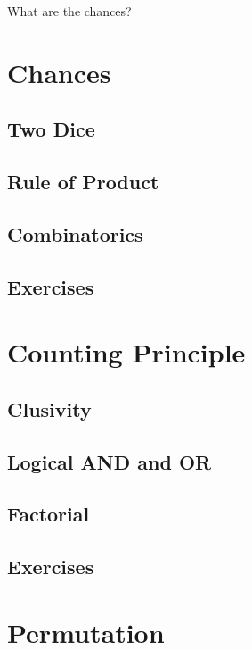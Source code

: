 
What are the chances?

\newpage
\chapterminitoc

\newpage
\section{Chances}
\subsection{Two Dice}
\noindent{}
\subsection{Rule of Product}
\subsection{Combinatorics}
\subsection{Exercises}

\newpage
\section{Counting Principle}
\subsection{Clusivity}
\noindent{}
\subsection{Logical AND and OR}
\subsection{Factorial}
\subsection{Exercises}

\newpage
\section{Permutation}
\noindent{}
